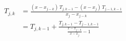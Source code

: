 \documentclass[preview,10pt,border=8pt]{standalone}
\begin{document}
	\begin{align}
		T_{j,k}
		&= \frac{(x - x_{j-k})\,T_{j,k-1}
			- (x - x_{j})\,T_{j-1,k-1}}
			{x_j - x_{j-k}} \\[1ex]
		&= T_{j,k-1}
			+ \frac{T_{j,k-1} - T_{j-1,k-1}}
				{\frac{x - x_{j-k}}
					{x - x_{j}} - 1}
	\end{align}
\morewhite
\end{document}
